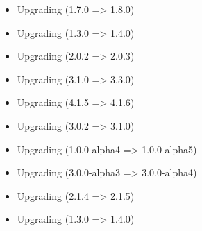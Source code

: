 \begin{itemize}
        \item Upgrading  (1.7.0 => 1.8.0)
        \item Upgrading  (1.3.0 => 1.4.0)
        \item Upgrading  (2.0.2 => 2.0.3)
        \item Upgrading  (3.1.0 => 3.3.0)
        \item Upgrading  (4.1.5 => 4.1.6)
        \item Upgrading  (3.0.2 => 3.1.0)
        \item Upgrading  (1.0.0-alpha4 => 1.0.0-alpha5)
        \item Upgrading  (3.0.0-alpha3 => 3.0.0-alpha4)
        \item Upgrading  (2.1.4 => 2.1.5)
        \item Upgrading  (1.3.0 => 1.4.0)
    \end{itemize}

